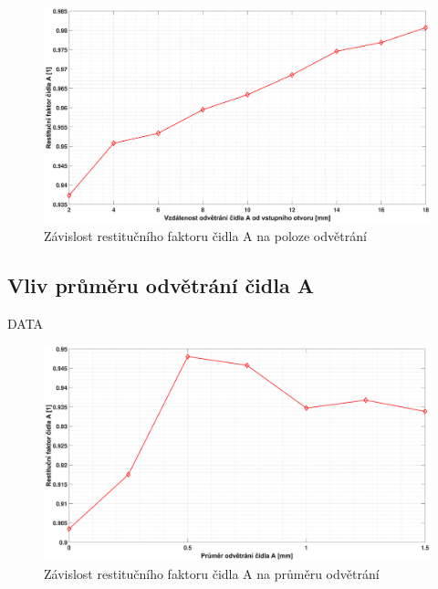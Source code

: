           \begin{figure}[ht!]
            \centering
            \includegraphics*[width=\textwidth, trim={5.25cm 1.0cm 5.8cm 2.0cm}]{400_SIMULACE_KONSTRUKCNICH_UPRAV/Grafy/06_poloha_odvetrani_A.eps}
            \caption{Závislost restitučního faktoru čidla A na poloze odvětrání}
            \label{fig:poloha-odvetrani-A}
        \end{figure}
    
    \newpage
    \subsection{Vliv průměru odvětrání čidla A}
        DATA
        
        \begin{figure}[ht!]
            \centering
            \includegraphics*[width=\textwidth, trim={5.25cm 1.0cm 5.8cm 2.0cm}]{400_SIMULACE_KONSTRUKCNICH_UPRAV/Grafy/07_prumer_odvetrani_A.eps}
            \caption{Závislost restitučního faktoru čidla A na průměru odvětrání}
            \label{fig:prumer-odvetrani-A}
        \end{figure}
    
